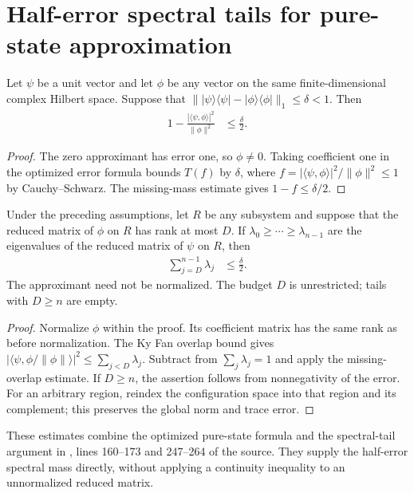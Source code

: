 \section{Half-error spectral tails for pure-state approximation}
\label{sec:pure_approximation_tail}

\begin{theorem}
  \label{thm:pure_error_missing_overlap}
  \leanok
  Let $\psi$ be a unit vector and let $\phi$ be any vector on the same
  finite-dimensional complex Hilbert space. Suppose that
  $\|\lvert\psi\rangle\langle\psi\rvert-
  \lvert\phi\rangle\langle\phi\rvert\|_1\le\delta<1$. Then
  \begin{align}
    \label{eq:pure_error_missing_overlap}
    1-\frac{|\langle\psi,\phi\rangle|^2}{\|\phi\|^2}
      &\le\frac{\delta}{2}.
  \end{align}
\end{theorem}
\begin{proof}\leanok
  The zero approximant has error one, so $\phi\ne0$. Taking coefficient one
  in the optimized error formula bounds $T(f)$ by $\delta$, where
  $f=|\langle\psi,\phi\rangle|^2/\|\phi\|^2\le1$ by Cauchy--Schwarz.
  The missing-mass estimate gives $1-f\le\delta/2$.
\end{proof}

\begin{theorem}
  \label{thm:pure_error_marginal_tail}
  \leanok
  Under the preceding assumptions, let $R$ be any subsystem and suppose
  that the reduced matrix of $\phi$ on $R$ has rank at most $D$.
  If $\lambda_0\ge\cdots\ge\lambda_{n-1}$ are the eigenvalues of the
  reduced matrix of $\psi$ on $R$, then
  \begin{align}
    \label{eq:pure_error_marginal_tail}
    \sum_{j=D}^{n-1}\lambda_j&\le\frac{\delta}{2}.
  \end{align}
  The approximant need not be normalized. The budget $D$ is unrestricted;
  tails with $D\ge n$ are empty.
\end{theorem}
\begin{proof}\leanok
  Normalize $\phi$ within the proof. Its coefficient matrix has the same
  rank as before normalization. The Ky Fan overlap bound gives
  $|\langle\psi,\phi/\|\phi\|\rangle|^2\le\sum_{j<D}\lambda_j$.
  Subtract from $\sum_j\lambda_j=1$ and apply the missing-overlap estimate.
  If $D\ge n$, the assertion follows from nonnegativity of the error.
  For an arbitrary region, reindex the configuration space into that region
  and its complement; this preserves the global norm and trace error.
\end{proof}

These estimates combine the optimized pure-state formula and the spectral-tail
argument in \cite{Schuch2008EntropyScaling}, lines 160--173 and 247--264
of the source. They supply the half-error spectral mass directly, without
applying a continuity inequality to an unnormalized reduced matrix.
